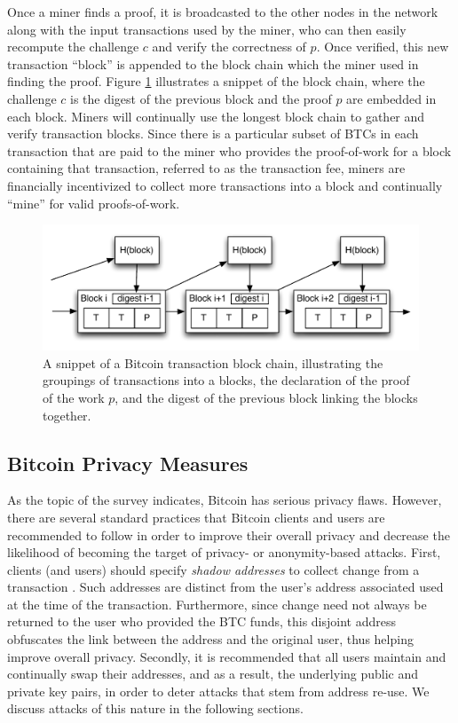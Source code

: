 Once a miner finds a proof, it is broadcasted to the other nodes in the network along with the input transactions used by the miner, who can then easily recompute the challenge $c$ and verify the correctness of $p$. Once verified, this new transaction ``block'' is appended to the block chain which the miner used in finding the proof. Figure \ref{fig:block} illustrates a snippet of the block chain, where the challenge $c$ is the digest of the previous block and the proof $p$ are embedded in each block. Miners will continually use the longest block chain to gather and verify transaction blocks. Since there is a particular subset of BTCs in each transaction that are paid to the miner who provides the proof-of-work for a block containing that transaction, referred to as the transaction fee, miners are financially incentivized to collect more transactions into a block and continually ``mine'' for valid proofs-of-work. 

\begin{center}
\begin{figure}
\includegraphics[scale=0.5]{./images/transaction_block_pow.pdf}
\caption{A snippet of a Bitcoin transaction block chain, illustrating the groupings of transactions into a blocks, the declaration of the proof of the work $p$, and the digest of the previous block linking the blocks together.}
\label{fig:block}
\end{figure}
\end{center}

\subsection{Bitcoin Privacy Measures}
As the topic of the survey indicates, Bitcoin has serious privacy flaws. However, there are several standard practices that Bitcoin clients and users are recommended to follow in order to improve their overall privacy and decrease the likelihood of becoming the target of privacy- or anonymity-based attacks. First, clients (and users) should specify \emph{shadow addresses} to collect change from a transaction \cite{bitcoin-shadow-addresses}. Such addresses are distinct from the user's address associated used at the time of the transaction. Furthermore, since change need not always be returned to the user who provided the BTC funds, this disjoint address obfuscates the link between the address and the original user, thus helping improve overall privacy. Secondly, it is recommended that all users maintain and continually swap their addresses, and as a result, the underlying public and private key pairs, in order to deter attacks that stem from address re-use. We discuss attacks of this nature in the following sections.

